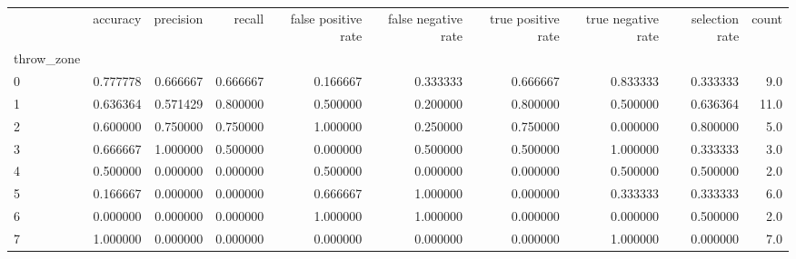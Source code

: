 \begin{tabular}{lrrrrrrrrr}
\toprule
{} &  accuracy &  precision &    recall &  false positive rate &  false negative rate &  true positive rate &  true negative rate &  selection rate &  count \\
throw\_zone &           &            &           &                      &                      &                     &                     &                 &        \\
\midrule
0          &  0.777778 &   0.666667 &  0.666667 &             0.166667 &             0.333333 &            0.666667 &            0.833333 &        0.333333 &    9.0 \\
1          &  0.636364 &   0.571429 &  0.800000 &             0.500000 &             0.200000 &            0.800000 &            0.500000 &        0.636364 &   11.0 \\
2          &  0.600000 &   0.750000 &  0.750000 &             1.000000 &             0.250000 &            0.750000 &            0.000000 &        0.800000 &    5.0 \\
3          &  0.666667 &   1.000000 &  0.500000 &             0.000000 &             0.500000 &            0.500000 &            1.000000 &        0.333333 &    3.0 \\
4          &  0.500000 &   0.000000 &  0.000000 &             0.500000 &             0.000000 &            0.000000 &            0.500000 &        0.500000 &    2.0 \\
5          &  0.166667 &   0.000000 &  0.000000 &             0.666667 &             1.000000 &            0.000000 &            0.333333 &        0.333333 &    6.0 \\
6          &  0.000000 &   0.000000 &  0.000000 &             1.000000 &             1.000000 &            0.000000 &            0.000000 &        0.500000 &    2.0 \\
7          &  1.000000 &   0.000000 &  0.000000 &             0.000000 &             0.000000 &            0.000000 &            1.000000 &        0.000000 &    7.0 \\
\bottomrule
\end{tabular}
